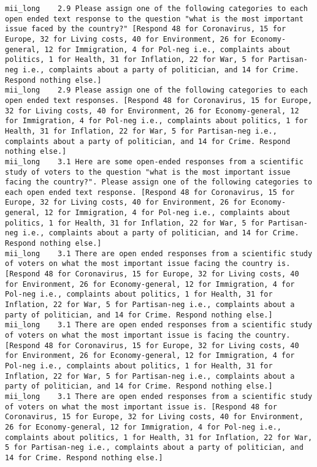 \begin{lstlisting}[label=lst:promptvariants]
mii_long	2.9	Please assign one of the following categories to each open ended text response to the question "what is the most important issue faced by the country?" [Respond 48 for Coronavirus, 15 for Europe, 32 for Living costs, 40 for Environment, 26 for Economy-general, 12 for Immigration, 4 for Pol-neg i.e., complaints about politics, 1 for Health, 31 for Inflation, 22 for War, 5 for Partisan-neg i.e., complaints about a party of politician, and 14 for Crime. Respond nothing else.]
mii_long	2.9	Please assign one of the following categories to each open ended text responses. [Respond 48 for Coronavirus, 15 for Europe, 32 for Living costs, 40 for Environment, 26 for Economy-general, 12 for Immigration, 4 for Pol-neg i.e., complaints about politics, 1 for Health, 31 for Inflation, 22 for War, 5 for Partisan-neg i.e., complaints about a party of politician, and 14 for Crime. Respond nothing else.]
mii_long	3.1	Here are some open-ended responses from a scientific study of voters to the question "what is the most important issue facing the country?". Please assign one of the following categories to each open ended text response. [Respond 48 for Coronavirus, 15 for Europe, 32 for Living costs, 40 for Environment, 26 for Economy-general, 12 for Immigration, 4 for Pol-neg i.e., complaints about politics, 1 for Health, 31 for Inflation, 22 for War, 5 for Partisan-neg i.e., complaints about a party of politician, and 14 for Crime. Respond nothing else.]
mii_long	3.1	There are open ended responses from a scientific study of voters on what the most important issue facing the country is. [Respond 48 for Coronavirus, 15 for Europe, 32 for Living costs, 40 for Environment, 26 for Economy-general, 12 for Immigration, 4 for Pol-neg i.e., complaints about politics, 1 for Health, 31 for Inflation, 22 for War, 5 for Partisan-neg i.e., complaints about a party of politician, and 14 for Crime. Respond nothing else.]
mii_long	3.1	There are open ended responses from a scientific study of voters on what the most important issue is facing the country. [Respond 48 for Coronavirus, 15 for Europe, 32 for Living costs, 40 for Environment, 26 for Economy-general, 12 for Immigration, 4 for Pol-neg i.e., complaints about politics, 1 for Health, 31 for Inflation, 22 for War, 5 for Partisan-neg i.e., complaints about a party of politician, and 14 for Crime. Respond nothing else.]
mii_long	3.1	There are open ended responses from a scientific study of voters on what the most important issue is. [Respond 48 for Coronavirus, 15 for Europe, 32 for Living costs, 40 for Environment, 26 for Economy-general, 12 for Immigration, 4 for Pol-neg i.e., complaints about politics, 1 for Health, 31 for Inflation, 22 for War, 5 for Partisan-neg i.e., complaints about a party of politician, and 14 for Crime. Respond nothing else.]

\end{lstlisting}
